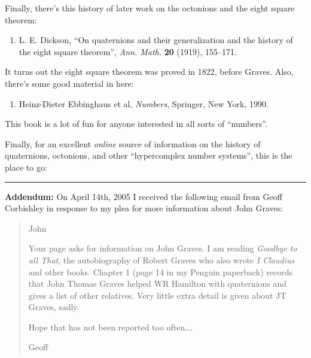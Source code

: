 \documentclass{article}
\def\tightlist{}
\renewcommand{\texttt}[1]{%
  \begingroup
  \ttfamily
  \begingroup\lccode`~=`/\lowercase{\endgroup\def~}{/\discretionary{}{}{}}%
  \begingroup\lccode`~=`[\lowercase{\endgroup\def~}{[\discretionary{}{}{}}%
  \begingroup\lccode`~=`.\lowercase{\endgroup\def~}{.\discretionary{}{}{}}%
  \catcode`/=\active\catcode`[=\active\catcode`.=\active
  \scantokens{#1\noexpand}%
  \endgroup
}
\begin{document}
Finally, there's this history of later work on the octonions and the
eight square theorem:

\begin{enumerate}
\def\labelenumi{\arabic{enumi})}
\setcounter{enumi}{5}
\tightlist
\item
  L. E. Dickson, ``On quaternions and their generalization and the
  history of the eight square theorem'', \emph{Ann. Math.} \textbf{20}
  (1919), 155--171.
\end{enumerate}

It turns out the eight square theorem was proved in 1822, before Graves.
Also, there's some good material in here:

\begin{enumerate}
\def\labelenumi{\arabic{enumi})}
\setcounter{enumi}{6}
\tightlist
\item
  Heinz-Dieter Ebbinghaus et al, \emph{Numbers}, Springer, New York,
  1990.
\end{enumerate}

This book is a lot of fun for anyone interested in all sorts of
``numbers''.

Finally, for an excellent \emph{online} source of information on the
history of quaternions, octonions, and other ``hypercomplex number
systems'', this is the place to go:


\begin{center}\rule{0.5\linewidth}{0.5pt}\end{center}

\textbf{Addendum:} On April 14th, 2005 I received the following email
from Geoff Corbishley in response to my plea for more information about
John Graves:

\begin{quote}
John

Your page asks for information on John Graves. I am reading
\emph{Goodbye to all That}, the autobiography of Robert Graves who also
wrote \emph{I Claudius} and other books. Chapter 1 (page 14 in my
Penguin paperback) records that John Thomas Graves helped WR Hamilton
with quaternions and gives a list of other relatives. Very little extra
detail is given about JT Graves, sadly.

Hope that has not been reported too often\ldots.

Geoff
\end{quote}
\end{document}
